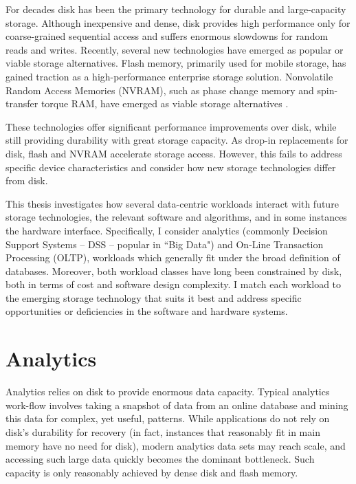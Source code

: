For decades disk has been the primary technology for durable and large-capacity storage.
Although inexpensive and dense, disk provides high performance only for coarse-grained sequential access and suffers enormous slowdowns for random reads and writes.
Recently, several new technologies have emerged as popular or viable storage alternatives.
Flash memory, primarily used for mobile storage, has gained traction as a high-performance enterprise storage solution.
Nonvolatile Random Access Memories (NVRAM), such as phase change memory and spin-transfer torque RAM, have emerged as viable storage alternatives \cite{BurrKurdi08}.

These technologies offer significant performance improvements over disk, while still providing durability with great storage capacity.
As drop-in replacements for disk, flash and NVRAM accelerate storage access.
However, this fails to address specific device characteristics and consider how new storage technologies differ from disk.

This thesis investigates how several data-centric workloads interact with future storage technologies, the relevant software and algorithms, and in some instances the hardware interface.
Specifically, I consider analytics (commonly Decision Support Systems -- DSS -- popular in ``Big Data") and On-Line Transaction Processing (OLTP), workloads which generally fit under the broad definition of databases.
Moreover, both workload classes have long been constrained by disk, both in terms of cost and software design complexity.
I match each workload to the emerging storage technology that suits it best and address specific opportunities or deficiencies in the software and hardware systems.

\section{Analytics}
\label{sec:Intro:Analytics}

Analytics relies on disk to provide enormous data capacity.
Typical analytics work-flow involves taking a snapshot of data from an online database and mining this data for complex, yet useful, patterns.
While applications do not rely on disk's durability for recovery (in fact, instances that reasonably fit in main memory have no need for disk), modern analytics data sets may reach  scale, and accessing such large data quickly becomes the dominant bottleneck.
Such capacity is only reasonably achieved by dense disk and flash memory.

